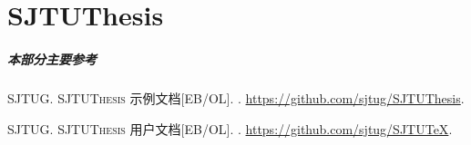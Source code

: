 
\part{SJTUThesis}

\begin{frame}
  \frametitle{本部分主要参考}
  \begin{bibliolist}{00}
    \onlineitem \textsc{SJTUG}.
    \newblock \textsc{SJTUThesis} 示例文档[EB/OL].
    . \url{https://github.com/sjtug/SJTUThesis}.

    \onlineitem \textsc{SJTUG}.
    \newblock \textsc{SJTUThesis} 用户文档[EB/OL].
    . \url{https://github.com/sjtug/SJTUTeX}.
  \end{bibliolist}
\end{frame}

